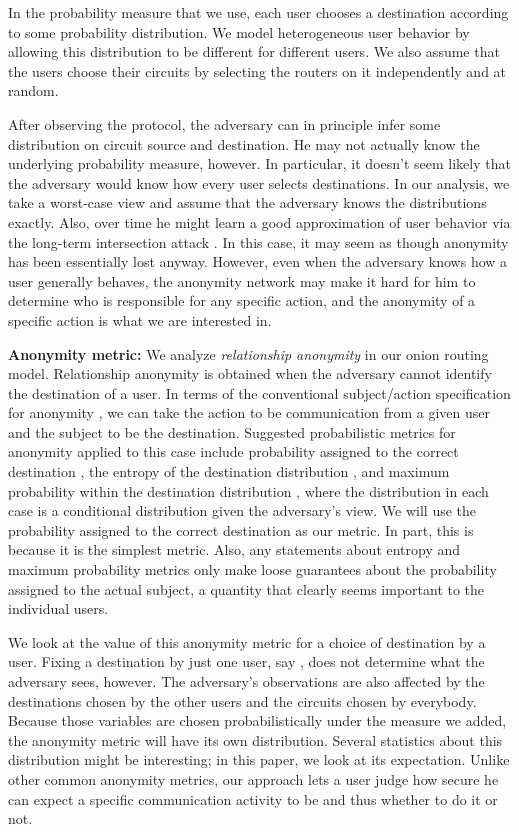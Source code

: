 \documentclass[prodmode,acmtissec]{acmsmall}
\begin{document}
In the probability measure that we use, each user chooses a destination according to some probability distribution.  We model heterogeneous user behavior by  allowing this distribution to be different for different users.  We also assume that the users choose their circuits by selecting the routers on it independently and at random.


After observing the protocol, the adversary
can in principle infer some distribution on circuit source and
destination.  He may not actually know the underlying probability
measure, however.  In particular, it doesn't seem likely that the
adversary would know how every user selects destinations.  In our
analysis, we take a worst-case view and assume that the adversary
knows the distributions exactly.  Also, over time he might learn a
good approximation of user behavior via the long-term intersection
attack \cite{DanSer04}.  In this case, it may seem as though anonymity
has been essentially lost anyway.  However, even when the adversary
knows how a user generally behaves, the anonymity network may make it
hard for him to determine who is responsible for any specific action,
and the anonymity of a specific action is what we are interested in.

{\bf Anonymity metric:} We analyze \emph{relationship anonymity} \cite{terminology,ShWa-Relationship} in our onion routing model.  Relationship anonymity is obtained when the adversary cannot identify the destination of a user.  In terms of the conventional subject/action specification for anonymity \cite{terminology}, we can take the action to be communication from a given user  and the subject to be the destination.  Suggested probabilistic metrics for anonymity applied to this case include probability assigned to the correct destination \cite{crowds:tissec}, the entropy of the destination distribution \cite{Diaz02,Serj02}, and maximum probability within the destination distribution \cite{TOTH}, where the distribution in each case is a conditional distribution given the adversary's view.  We will use the probability assigned to the correct destination as our metric.  In part, this is because it is the simplest metric.  Also, any statements about entropy and maximum probability metrics only make loose guarantees about the probability assigned to the actual subject, a quantity that clearly seems important to the individual users.

We look at the value of this anonymity metric for a choice of
destination by a user.  Fixing a destination by just one user, say
, does not determine what the adversary sees, however.  The
adversary's observations are also affected by the destinations chosen
by the other users and the circuits chosen by everybody.  Because
those variables are chosen probabilistically under the measure we
added, the anonymity metric will have its own distribution.  Several
statistics about this distribution might be interesting; in this
paper, we look at its expectation. Unlike other common anonymity
metrics, our approach lets a user judge how secure he can expect a
specific communication activity to be and thus whether to do it or
not.
\end{document}
